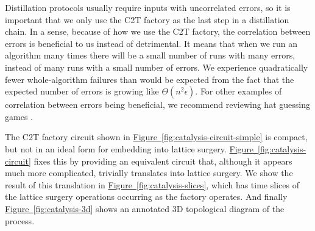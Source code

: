 \documentclass[superscriptaddress,notitlepage,longbibliography]{revtex4-1}
\newcommand{\fig}[1]{\hyperref[fig:#1]{Figure~\ref*{fig:#1}}}
\begin{document}
Distillation protocols usually require inputs with uncorrelated errors, so it is important that we only use the C2T factory as the last step in a distillation chain.
In a sense, because of how we use the C2T factory, the correlation between errors is beneficial to us instead of detrimental.
It means that when we run an algorithm many times there will be a small number of runs with many errors, instead of many runs with a small number of errors.
We experience quadratically fewer whole-algorithm failures than would be expected from the fact that the expected number of errors is growing like $\Theta(n^2 \epsilon)$.
For other examples of correlation between errors being beneficial, we recommend reviewing hat guessing games \cite{paterson2010}.

The C2T factory circuit shown in \fig{catalysis-circuit-simple} is compact, but not in an ideal form for embedding into lattice surgery.
\fig{catalysis-circuit} fixes this by providing an equivalent circuit that, although it appears much more complicated, trivially translates into lattice surgery.
We show the result of this translation in \fig{catalysis-slices}, which has time slices of the lattice surgery operations occurring as the factory operates.
And finally \fig{catalysis-3d} shows an annotated 3D topological diagram of the process.
\end{document}
